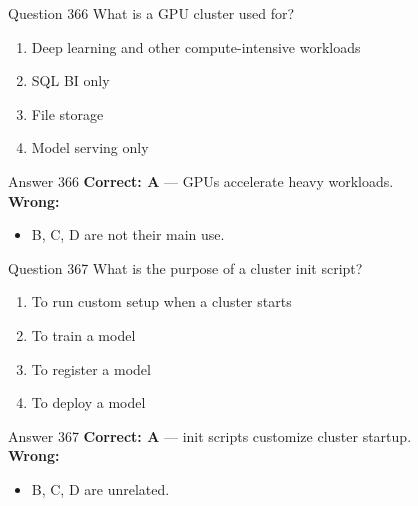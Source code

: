 \documentclass[aspectratio=169,11pt]{beamer}
\begin{document}
	\begin{frame}{Question 366}
		What is a GPU cluster used for?
		\begin{enumerate}[label=\Alph*.]
			\item Deep learning and other compute-intensive workloads
			\item SQL BI only
			\item File storage
			\item Model serving only
		\end{enumerate}
	\end{frame}
	\begin{frame}{Answer 366}
		\textbf{Correct: A} --- GPUs accelerate heavy workloads.\\
		\vspace{0.5em}
		\textbf{Wrong:}
		\begin{itemize}
			\item B, C, D are not their main use.
		\end{itemize}
	\end{frame}
	
	\begin{frame}{Question 367}
		What is the purpose of a cluster init script?
		\begin{enumerate}[label=\Alph*.]
			\item To run custom setup when a cluster starts
			\item To train a model
			\item To register a model
			\item To deploy a model
		\end{enumerate}
	\end{frame}
	\begin{frame}{Answer 367}
		\textbf{Correct: A} --- init scripts customize cluster startup.\\
		\vspace{0.5em}
		\textbf{Wrong:}
		\begin{itemize}
			\item B, C, D are unrelated.
		\end{itemize}
	\end{frame}
	
\end{document}
